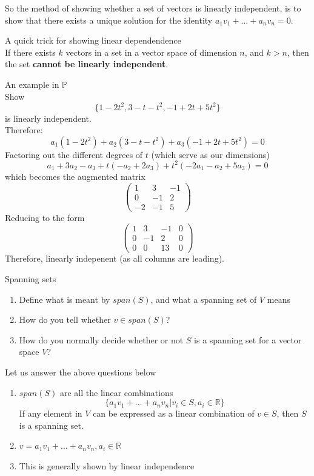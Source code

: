 \documentclass[journal, letterpaper]{IEEEtran}
\begin{document}
    So the method of showing whether a set of vectors is linearly independent, is to show that there exists a unique solution for the identity $a_1v_1 + \dots + a_nv_n = 0$.
    \begin{myboxr}{A quick trick for showing linear dependendence} \\ 
        If there exists $k$ vectors in a set in a vector space of dimension $n$, and $k > n$, then the set \textbf{cannot be linearly independent}.
    \end{myboxr}
    \begin{myboxg}{An example in $\mathbb{P}$} \\ 
        Show 
        $$ \{ 1 - 2t^2, 3-t-t^2, -1 + 2t + 5t^2\}$$
        is linearly independent.
        \newline \\ 
        Therefore:
        $$ a_1(1-2t^2) + a_2(3-t-t^2) + a_3(-1 + 2t +5t^2) = 0$$
        Factoring out the different degrees of $t$ (which serve as our dimensions)
        $$
        a_1 + 3a_2 - a_3 + t(-a_2 + 2a_3) + t^2(-2a_1 - a_2 + 5a_3) = 0
        $$
        which becomes the augmented matrix
        $$
        \begin{pmatrix}
            1 & 3 & -1 \\ 0 & -1 & 2 \\ -2 & -1 & 5
        \end{pmatrix}
        $$
        Reducing to the form
        $$
        \begin{pmatrix}
            1 & 3 & -1 & 0 \\ 0 & -1 & 2 & 0 \\ 0 & 0 & 13 & 0
        \end{pmatrix}
        $$
        Therefore, linearly indepenent (as all columns are leading).
    \end{myboxg}
    \newpage
    \begin{mybox}{Spanning sets}
        \begin{enumerate}
            \item Define what is meant by $span(S)$, and what a spanning set of $V$ means
            \item How do you tell whether $v \in span(S)$?
            \item How do you normally decide whether or not $S$ is a spanning set for a vector space $V$?
        \end{enumerate}
    \end{mybox}
    Let us answer the above questions below 
    \begin{enumerate}
        \item $span(S)$ are all the linear combinations
        $$ \{ a_1v_1 + \dots + a_nv_n | v_i \in S, a_i \in \mathbb{R}\}$$
        If any element in $V$ can be expressed as a linear combination of $v \in S$, then $S$ is a spanning set.
        \item $v = a_1v_1 + \dots + a_nv_n, a_i \in \mathbb{R}$
        \item This is generally shown by linear independence
    \end{enumerate}
\end{document}
